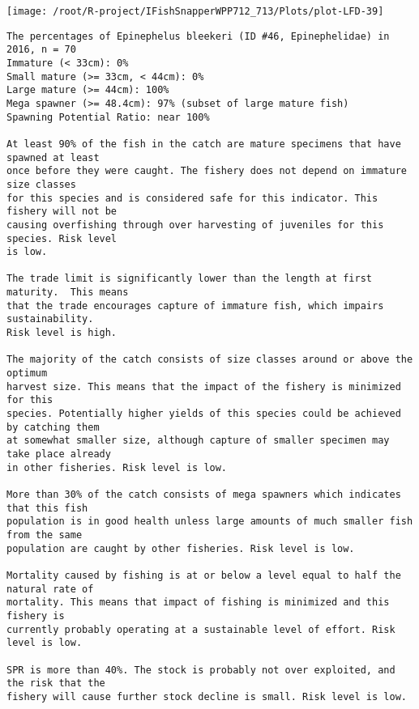 \documentclass{report}\usepackage[]{graphicx}\usepackage[]{color}
\makeatletter
\def\maxwidth{ %
  \ifdim\Gin@nat@width>\linewidth
    \linewidth
  \else
    \Gin@nat@width
  \fi
}
\newenvironment{kframe}{%
 \def\at@end@of@kframe{}%
 \ifinner\ifhmode%
  \def\at@end@of@kframe{\end{minipage}}%
  \begin{minipage}{\columnwidth}%
 \fi\fi%
 \def\FrameCommand##1{\hskip\@totalleftmargin \hskip-\fboxsep
 \colorbox{shadecolor}{##1}\hskip-\fboxsep
     \hskip-\linewidth \hskip-\@totalleftmargin \hskip\columnwidth}%
 \MakeFramed {\advance\hsize-\width
   \@totalleftmargin\z@ \linewidth\hsize
   \@setminipage}}%
 {\par\unskip\endMakeFramed%
 \at@end@of@kframe}
\newenvironment{knitrout}{}{} %
\makeatother
\begin{document}
\begin{knitrout}
\texttt{[image: /root/R-project/IFishSnapperWPP712\_713/Plots/plot-LFD-39]} 
\begin{kframe}\begin{verbatim}
The percentages of Epinephelus bleekeri (ID #46, Epinephelidae) in 2016, n = 70
Immature (< 33cm): 0%
Small mature (>= 33cm, < 44cm): 0%
Large mature (>= 44cm): 100%
Mega spawner (>= 48.4cm): 97% (subset of large mature fish)
Spawning Potential Ratio: near 100%
 
At least 90% of the fish in the catch are mature specimens that have spawned at least
once before they were caught. The fishery does not depend on immature size classes
for this species and is considered safe for this indicator. This fishery will not be
causing overfishing through over harvesting of juveniles for this species. Risk level
is low.

The trade limit is significantly lower than the length at first maturity.  This means
that the trade encourages capture of immature fish, which impairs sustainability.
Risk level is high.

The majority of the catch consists of size classes around or above the optimum
harvest size. This means that the impact of the fishery is minimized for this
species. Potentially higher yields of this species could be achieved by catching them
at somewhat smaller size, although capture of smaller specimen may take place already
in other fisheries. Risk level is low.

More than 30% of the catch consists of mega spawners which indicates that this fish
population is in good health unless large amounts of much smaller fish from the same
population are caught by other fisheries. Risk level is low.
 
Mortality caused by fishing is at or below a level equal to half the natural rate of
mortality. This means that impact of fishing is minimized and this fishery is
currently probably operating at a sustainable level of effort. Risk level is low.
 
SPR is more than 40%. The stock is probably not over exploited, and the risk that the
fishery will cause further stock decline is small. Risk level is low.
 

\end{verbatim}
\end{kframe}
\end{knitrout}
\end{document}
